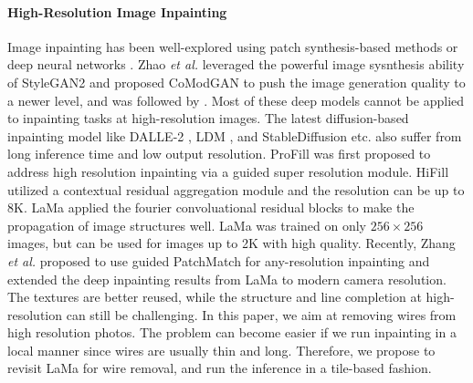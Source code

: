 \paragraph{High-Resolution Image Inpainting}
Image inpainting has been well-explored using patch synthesis-based methods \cite{barnes2009patchmatch, wexler2007space, darabi2012image, kaspar2015self} or deep neural networks \cite{contextencoder, globallocal, partialconv, contextual, yu2019free, xu2022image}. Zhao \textit{et al.} leveraged the powerful image sysnthesis ability of StyleGAN2 \cite{karras2020analyzing} and proposed CoModGAN \cite{comodgan} to push the image generation quality to a newer level, and was followed by \cite{zheng2022cm, jain2022keys}. Most of these deep models cannot be applied to inpainting tasks at high-resolution images. The latest diffusion-based inpainting model like DALLE-2 \cite{dalle}, LDM \cite{rombach2022high}, and StableDiffusion etc. also suffer from long inference time and low output resolution. ProFill \cite{zeng2020high} was first proposed to address high resolution inpainting via a guided super resolution module. HiFill \cite{hifill} utilized a contextual residual aggregation module and the resolution can be up to 8K. LaMa \cite{suvorov2022resolution} applied the fourier convoluational residual blocks to make the propagation of image structures well. LaMa was trained on only $256 \times 256$ images, but can be used for images up to 2K with high quality. Recently, Zhang \textit{et al.} \cite{supercaf} proposed to use guided PatchMatch for any-resolution inpainting and extended the deep inpainting results from LaMa to modern camera resolution. The textures are better reused, while the structure and line completion at high-resolution can still be challenging. In this paper, we aim at removing wires from high resolution photos. The problem can become easier if we run inpainting in a local manner since wires are usually thin and long. Therefore, we propose to revisit LaMa for wire removal, and run the inference in a tile-based fashion. 
